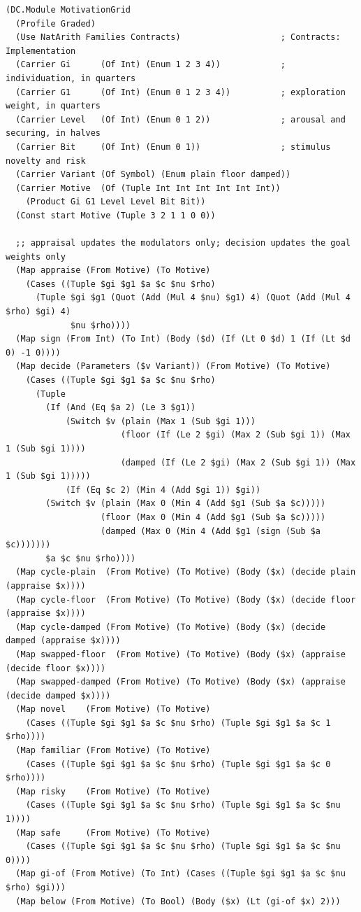 \documentclass[11pt]{article}
\theoremstyle{definition}
\theoremstyle{plain}
\begin{document}
\begin{lstlisting}[style=mettamod]
(DC.Module MotivationGrid
  (Profile Graded)
  (Use NatArith Families Contracts)                    ; Contracts: Implementation
  (Carrier Gi      (Of Int) (Enum 1 2 3 4))            ; individuation, in quarters
  (Carrier G1      (Of Int) (Enum 0 1 2 3 4))          ; exploration weight, in quarters
  (Carrier Level   (Of Int) (Enum 0 1 2))              ; arousal and securing, in halves
  (Carrier Bit     (Of Int) (Enum 0 1))                ; stimulus novelty and risk
  (Carrier Variant (Of Symbol) (Enum plain floor damped))
  (Carrier Motive  (Of (Tuple Int Int Int Int Int Int))
    (Product Gi G1 Level Level Bit Bit))
  (Const start Motive (Tuple 3 2 1 1 0 0))

  ;; appraisal updates the modulators only; decision updates the goal weights only
  (Map appraise (From Motive) (To Motive)
    (Cases ((Tuple $gi $g1 $a $c $nu $rho)
      (Tuple $gi $g1 (Quot (Add (Mul 4 $nu) $g1) 4) (Quot (Add (Mul 4 $rho) $gi) 4)
             $nu $rho))))
  (Map sign (From Int) (To Int) (Body ($d) (If (Lt 0 $d) 1 (If (Lt $d 0) -1 0))))
  (Map decide (Parameters ($v Variant)) (From Motive) (To Motive)
    (Cases ((Tuple $gi $g1 $a $c $nu $rho)
      (Tuple
        (If (And (Eq $a 2) (Le 3 $g1))
            (Switch $v (plain (Max 1 (Sub $gi 1)))
                       (floor (If (Le 2 $gi) (Max 2 (Sub $gi 1)) (Max 1 (Sub $gi 1))))
                       (damped (If (Le 2 $gi) (Max 2 (Sub $gi 1)) (Max 1 (Sub $gi 1)))))
            (If (Eq $c 2) (Min 4 (Add $gi 1)) $gi))
        (Switch $v (plain (Max 0 (Min 4 (Add $g1 (Sub $a $c)))))
                   (floor (Max 0 (Min 4 (Add $g1 (Sub $a $c)))))
                   (damped (Max 0 (Min 4 (Add $g1 (sign (Sub $a $c)))))))
        $a $c $nu $rho))))
  (Map cycle-plain  (From Motive) (To Motive) (Body ($x) (decide plain (appraise $x))))
  (Map cycle-floor  (From Motive) (To Motive) (Body ($x) (decide floor (appraise $x))))
  (Map cycle-damped (From Motive) (To Motive) (Body ($x) (decide damped (appraise $x))))
  (Map swapped-floor  (From Motive) (To Motive) (Body ($x) (appraise (decide floor $x))))
  (Map swapped-damped (From Motive) (To Motive) (Body ($x) (appraise (decide damped $x))))
  (Map novel    (From Motive) (To Motive)
    (Cases ((Tuple $gi $g1 $a $c $nu $rho) (Tuple $gi $g1 $a $c 1 $rho))))
  (Map familiar (From Motive) (To Motive)
    (Cases ((Tuple $gi $g1 $a $c $nu $rho) (Tuple $gi $g1 $a $c 0 $rho))))
  (Map risky    (From Motive) (To Motive)
    (Cases ((Tuple $gi $g1 $a $c $nu $rho) (Tuple $gi $g1 $a $c $nu 1))))
  (Map safe     (From Motive) (To Motive)
    (Cases ((Tuple $gi $g1 $a $c $nu $rho) (Tuple $gi $g1 $a $c $nu 0))))
  (Map gi-of (From Motive) (To Int) (Cases ((Tuple $gi $g1 $a $c $nu $rho) $gi)))
  (Map below (From Motive) (To Bool) (Body ($x) (Lt (gi-of $x) 2)))


\end{lstlisting}
\end{document}
